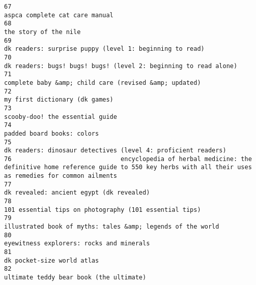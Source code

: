 \documentclass[
]{report}
\begin{document}
\begin{verbatim}
67                                                                                                                                         aspca complete cat care manual
68                                                                                                                                                  the story of the nile
69                                                                                                                dk readers: surprise puppy (level 1: beginning to read)
70                                                                                                       dk readers: bugs! bugs! bugs! (level 2: beginning to read alone)
71                                                                                                                 complete baby &amp; child care (revised &amp; updated)
72                                                                                                                                         my first dictionary (dk games)
73                                                                                                                                        scooby-doo! the essential guide
74                                                                                                                                             padded board books: colors
75                                                                                                          dk readers: dinosaur detectives (level 4: proficient readers)
76                              encyclopedia of herbal medicine: the definitive home reference guide to 550 key herbs with all their uses as remedies for common ailments
77                                                                                                                               dk revealed: ancient egypt (dk revealed)
78                                                                                                                 101 essential tips on photography (101 essential tips)
79                                                                                                            illustrated book of myths: tales &amp; legends of the world
80                                                                                                                               eyewitness explorers: rocks and minerals
81                                                                                                                                             dk pocket-size world atlas
82                                                                                                                                ultimate teddy bear book (the ultimate)

\end{verbatim}
\end{document}
